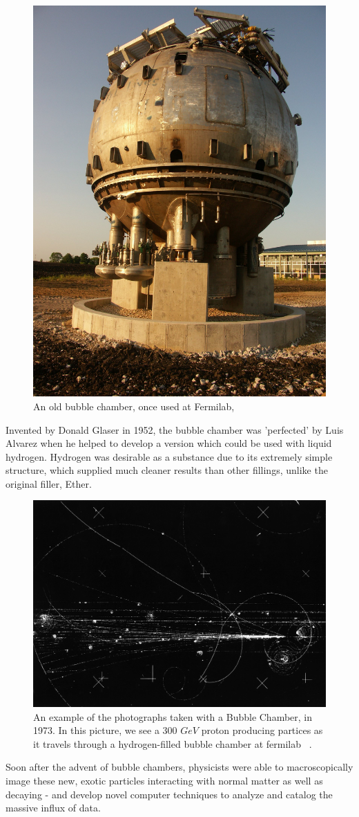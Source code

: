 \begin{figure}[ht]
	\centering
	\includegraphics[width=0.5\linewidth]{../Chapter2/fig/bubblechamberfnal.jpg}
	\caption{An old bubble chamber, once used at Fermilab,
	~\cite{FNALBubbleChamber2005}}
	\label{fig:bubble_chamber}
\end{figure}

Invented by Donald Glaser in 1952, the bubble chamber was 'perfected' by Luis
Alvarez when he helped to develop a version which could be used with liquid
hydrogen. Hydrogen was desirable as a substance due to its extremely simple
structure, which supplied much cleaner results than other fillings, unlike the
original filler, Ether.

\begin{figure}[ht]
	\centering
	\includegraphics[width=0.5\linewidth]{../Chapter2/fig/bubble_chamber_tracks.jpg}
	\caption{
		An example of the photographs taken with a Bubble Chamber, in 1973.
		In this picture, we see a 300 $GeV$ proton producing partices as it travels
		through a hydrogen-filled bubble chamber at fermilab ~\cite{HD6B235}.
	}
	\label{fig:bubble_tracks}
\end{figure}

Soon after the advent of bubble chambers, physicists were able to
macroscopically image these new, exotic particles interacting with normal matter
as well as decaying - and develop novel computer techniques to analyze and
catalog the massive influx of data.


